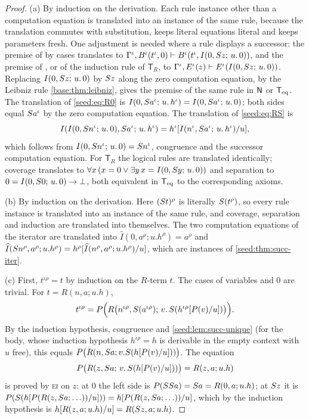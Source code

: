 \begin{proof}
(a) By induction on the derivation. Each rule instance other than a
computation equation is translated into an instance of the same rule,
because the translation commutes with substitution, keeps literal equations
literal and keeps parameters fresh. One adjustment is needed where a rule
displays a successor: the premise of  by cases translates to
$\Gamma^{\iota},B^{\iota}(t^{\iota},0)\vdash
B^{\iota}(t^{\iota},I(0,S z;\,u.\,0))$, and the premise of
, or of the induction rule of $\mathsf{T}_R$, to
$\Gamma^{\iota},E^{\iota}(z)\vdash E^{\iota}(I(0,S z;\,u.\,0))$.
Replacing $I(0,S z;\,u.\,0)$ by $S z$ along the zero computation
equation, by the Leibniz rule \cref{base:thm:leibniz}, gives the
premise of the same rule in $\mathsf{N}$ or $\mathsf{T}_{\mathrm{eq}}$. The translation of
\eqref{seed:eq:R0} is
$I(0,S a^{\iota};\,u.\,h^{\iota})=I(0,S a^{\iota};\,u.\,0)$; both
sides equal $S a^{\iota}$ by the zero computation equation. The
translation of \eqref{seed:eq:RS} is
\[
 I(I(0,S n^{\iota};\,u.\,0),S a^{\iota};\,u.\,h^{\iota})
 =h^{\iota}[I(n^{\iota},S a^{\iota};\,u.\,h^{\iota})/u],
\]
which follows from $I(0,S n^{\iota};\,u.\,0)=S n^{\iota}$, congruence
and the successor computation equation. For $\mathsf{T}_R$ the logical rules
are translated identically; coverage translates to
$\forall x\,(x=0\lor\exists y\,x=I(0,S y;\,u.\,0))$ and separation to
$0=I(0,S 0;\,u.\,0)\to\bot$, both equivalent in $\mathsf{T}_{\mathrm{eq}}$ to the
corresponding axioms.

(b) By induction on the derivation. Here $(S t)^{\rho}$ is literally
$S(t^{\rho})$, so every rule instance is translated into an instance of
the same rule, and coverage, separation and induction are translated into
themselves. The two computation equations of the iterator are translated
into
$\widehat I(0,a^{\rho};u.h^{\rho})=a^{\rho}$ and
$\widehat I(S n^{\rho},a^{\rho};u.h^{\rho})
=h^{\rho}[\widehat I(n^{\rho},a^{\rho};u.h^{\rho})/u]$, which are
instances of \cref{seed:thm:succ-iter}.

(c) First, $t^{\iota\rho}=t$ by induction on the $R$-term $t$. The cases of
variables and $0$ are trivial. For $t=R(n,a;u.h)$,
\[
 t^{\iota\rho}
 =P\Bigl(R\bigl(n^{\iota\rho},S(a^{\iota\rho});\,
   v.\,S(h^{\iota\rho}[P(v)/u])\bigr)\Bigr).
\]
By the induction hypothesis, congruence and
\cref{seed:lem:succ-unique} (for the body, whose induction hypothesis
$h^{\iota\rho}=h$ is derivable in the empty context with $u$ free), this
equals $P\bigl(R(n,S a;v.S(h[P(v)/u]))\bigr)$. The equation
\[
 P\bigl(R(z,S a;\,v.\,S(h[P(v)/u]))\bigr)=R(z,a;u.h)
\]
is proved by \textsc{ei} on $z$: at $0$ the left side is
$P(SS a)=S a=R(0,a;u.h)$; at $S z$ it is
$P(S(h[P(R(z,S a;\ldots))/u]))=h[P(R(z,S a;\ldots))/u]$,
which by the induction hypothesis is
$h[R(z,a;u.h)/u]=R(S z,a;u.h)$.


\end{proof}

